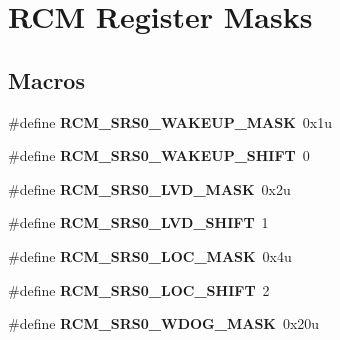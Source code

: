 \hypertarget{group___r_c_m___register___masks}{}\section{R\+C\+M Register Masks}
\label{group___r_c_m___register___masks}
\subsection*{Macros}
\begin{DoxyCompactItemize}
\item 
\hypertarget{group___r_c_m___register___masks_gacdeb6976064d599d6cd063b26a25dbda}{}\#define {\bfseries R\+C\+M\+\_\+\+S\+R\+S0\+\_\+\+W\+A\+K\+E\+U\+P\+\_\+\+M\+A\+S\+K}~0x1u\label{group___r_c_m___register___masks_gacdeb6976064d599d6cd063b26a25dbda}

\item 
\hypertarget{group___r_c_m___register___masks_ga2e140fc50106a6145cffe4b72671bbc2}{}\#define {\bfseries R\+C\+M\+\_\+\+S\+R\+S0\+\_\+\+W\+A\+K\+E\+U\+P\+\_\+\+S\+H\+I\+F\+T}~0\label{group___r_c_m___register___masks_ga2e140fc50106a6145cffe4b72671bbc2}

\item 
\hypertarget{group___r_c_m___register___masks_ga4de74187b3bcc5b40a526b3ab5afda88}{}\#define {\bfseries R\+C\+M\+\_\+\+S\+R\+S0\+\_\+\+L\+V\+D\+\_\+\+M\+A\+S\+K}~0x2u\label{group___r_c_m___register___masks_ga4de74187b3bcc5b40a526b3ab5afda88}

\item 
\hypertarget{group___r_c_m___register___masks_gad3f4cb02d84182ddd0933dc93e1ec4ba}{}\#define {\bfseries R\+C\+M\+\_\+\+S\+R\+S0\+\_\+\+L\+V\+D\+\_\+\+S\+H\+I\+F\+T}~1\label{group___r_c_m___register___masks_gad3f4cb02d84182ddd0933dc93e1ec4ba}

\item 
\hypertarget{group___r_c_m___register___masks_ga0983314adae781518e2481ae518e14d8}{}\#define {\bfseries R\+C\+M\+\_\+\+S\+R\+S0\+\_\+\+L\+O\+C\+\_\+\+M\+A\+S\+K}~0x4u\label{group___r_c_m___register___masks_ga0983314adae781518e2481ae518e14d8}

\item 
\hypertarget{group___r_c_m___register___masks_ga87c1e113b052d6c10c450973efa74eb7}{}\#define {\bfseries R\+C\+M\+\_\+\+S\+R\+S0\+\_\+\+L\+O\+C\+\_\+\+S\+H\+I\+F\+T}~2\label{group___r_c_m___register___masks_ga87c1e113b052d6c10c450973efa74eb7}

\item 
\hypertarget{group___r_c_m___register___masks_gad203634bcb298bf54a3d5cce5c378a7e}{}\#define {\bfseries R\+C\+M\+\_\+\+S\+R\+S0\+\_\+\+W\+D\+O\+G\+\_\+\+M\+A\+S\+K}~0x20u\label{group___r_c_m___register___masks_gad203634bcb298bf54a3d5cce5c378a7e}


\end{DoxyCompactItemize}
